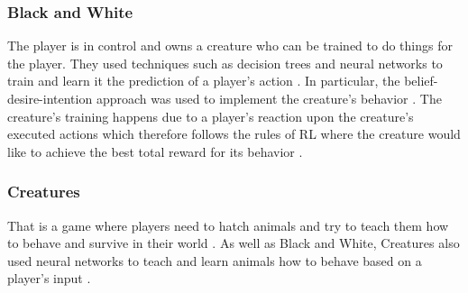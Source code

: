 \documentclass[MGS,Master,english]{twbook}%
\begin{document}
\subsubsection{Black and White}
The player is in control and owns a creature who can be trained to do things for the player. They used techniques such as decision trees and neural networks to train and learn it the prediction of a player's action \cite{ml::gamasutra::ml} \cite{ml::mostInfluentalAiGames}. In particular, the belief-desire-intention approach was used to implement the creature's behavior \cite{ml::mostInfluentalAiGames}. The creature's training happens due to a player’s reaction upon the creature's executed actions which therefore follows the rules of RL where the creature would like to achieve the best total reward for its behavior \cite{ml::gamasutra::ml}.

\subsubsection{Creatures}
That is a game where players need to hatch animals and try to teach them how to behave and survive in their world \cite{ml::mostInfluentalAiGames}. As well as Black and White, Creatures also used neural networks to teach and learn animals how to behave based on a player's input \cite{ml::mostInfluentalAiGames}.
\end{document}

